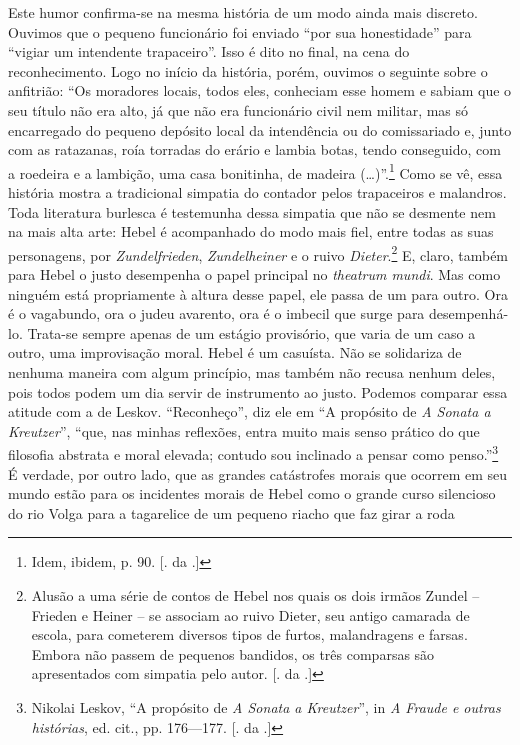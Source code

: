 Este humor confirma-se na mesma história de um modo ainda mais discreto.
Ouvimos que o pequeno funcionário foi enviado ``por sua honestidade''
para ``vigiar um intendente trapaceiro''. Isso é dito no final, na cena
do reconhecimento. Logo no início da história, porém, ouvimos o seguinte
sobre o anfitrião: ``Os moradores locais, todos eles, conheciam esse
homem e sabiam que o seu título não era alto, já que não era funcionário
civil nem militar, mas só encarregado do pequeno depósito local da
intendência ou do comissariado e, junto com as ratazanas, roía torradas
do erário e lambia botas, tendo conseguido, com a roedeira e a lambição,
uma casa bonitinha, de madeira (\ldots{})''.\footnote{Idem, ibidem, p. 90.
  [. da .]} Como se vê, essa história mostra a tradicional
simpatia do contador pelos trapaceiros e malandros. Toda literatura
burlesca é testemunha dessa simpatia que não se desmente nem na mais
alta arte: Hebel é acompanhado do modo mais fiel, entre todas as suas
personagens, por \emph{Zundelfrieden}, \emph{Zundelheiner} e o ruivo
\emph{Dieter}.\footnote{Alusão a uma série de contos de Hebel nos quais
  os dois irmãos Zundel -- Frieden e Heiner -- se associam ao ruivo
  Dieter, seu antigo camarada de escola, para cometerem diversos tipos
  de furtos, malandragens e farsas. Embora não passem de pequenos
  bandidos, os três comparsas são apresentados com simpatia pelo autor.
  [. da .]} E, claro, também para Hebel o justo desempenha o papel
principal no \emph{theatrum mundi}. Mas como ninguém está propriamente à
altura desse papel, ele passa de um para outro. Ora é o vagabundo, ora o
judeu avarento, ora é o imbecil que surge para desempenhá-lo. Trata-se
sempre apenas de um estágio provisório, que varia de um caso a outro,
uma improvisação moral. Hebel é um casuísta. Não se solidariza de
nenhuma maneira com algum princípio, mas também não recusa nenhum deles,
pois todos podem um dia servir de instrumento ao justo. Podemos comparar
essa atitude com a de Leskov. ``Reconheço'', diz ele em ``A propósito de
\emph{A Sonata a Kreutzer}'', ``que, nas minhas reflexões, entra muito
mais senso prático do que filosofia abstrata e moral elevada; contudo
sou inclinado a pensar como penso.''\footnote{Nikolai Leskov, ``A
  propósito de \emph{A Sonata a Kreutzer}'', in \emph{A Fraude e outras
  histórias}, ed. cit., pp. 176---177. [. da .]} É verdade, por
outro lado, que as grandes catástrofes morais que ocorrem em seu mundo
estão para os incidentes morais de Hebel como o grande curso silencioso
do rio Volga para a tagarelice de um pequeno riacho que faz girar a roda
